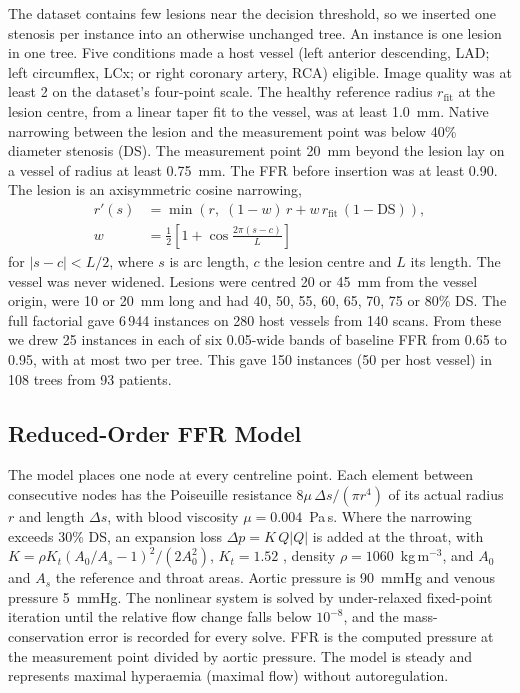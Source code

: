\documentclass[journal]{IEEEtran}
\begin{document}
The dataset contains few lesions near the decision threshold, so we inserted one stenosis per instance into an
otherwise unchanged tree. An instance is one lesion in one tree. Five conditions made a host vessel (left anterior
descending, LAD; left circumflex, LCx; or right coronary artery, RCA) eligible. Image quality was at least 2 on the
dataset's four-point scale. The healthy reference radius $r_\mathrm{fit}$ at the lesion centre, from a linear taper
fit to the vessel, was at least 1.0~mm. Native narrowing between the lesion and the measurement point was below
40\% diameter stenosis (DS). The measurement point 20~mm beyond the lesion lay on a vessel of radius at least
0.75~mm. The FFR before insertion was at least 0.90. The lesion is an axisymmetric cosine narrowing,
\begin{equation}
\begin{aligned}
r'(s) &= \min\!\left(r,\; (1-w)\,r + w\,r_\mathrm{fit}\,(1-\mathrm{DS})\right),\\
w &= \tfrac{1}{2}\left[1+\cos\tfrac{2\pi (s-c)}{L}\right]
\end{aligned}
\end{equation}
for $|s-c|<L/2$, where $s$ is arc length, $c$ the lesion centre and $L$ its length. The vessel was never widened.
Lesions were centred 20 or 45~mm from the vessel origin, were 10 or 20~mm long and had 40, 50, 55, 60, 65, 70, 75
or 80\% DS. The full factorial gave 6\,944 instances on 280 host vessels from 140 scans. From these we drew 25
instances in each of six 0.05-wide bands of baseline FFR from 0.65 to 0.95, with at most two per tree. This gave
150 instances (50 per host vessel) in 108 trees from 93 patients.

\subsection{Reduced-Order FFR Model}
The model places one node at every centreline point. Each element between consecutive nodes has the Poiseuille
resistance $8\mu\,\Delta s/(\pi r^4)$ of its actual radius $r$ and length $\Delta s$, with blood viscosity
$\mu = 0.004$~Pa\,s. Where the narrowing exceeds 30\% DS, an expansion loss $\Delta p = K\,Q|Q|$ is added at the
throat, with $K = \rho K_t (A_0/A_s - 1)^2 / (2A_0^2)$, $K_t = 1.52$ \cite{young1973}, density
$\rho = 1060$~kg\,m$^{-3}$, and $A_0$ and $A_s$ the reference and throat areas. Aortic pressure is 90~mmHg and
venous pressure 5~mmHg. The nonlinear system is solved by under-relaxed fixed-point iteration until the relative
flow change falls below $10^{-8}$, and the mass-conservation error is recorded for every solve. FFR is the computed
pressure at the measurement point divided by aortic pressure. The model is steady and represents maximal hyperaemia
(maximal flow) without autoregulation.
\end{document}
